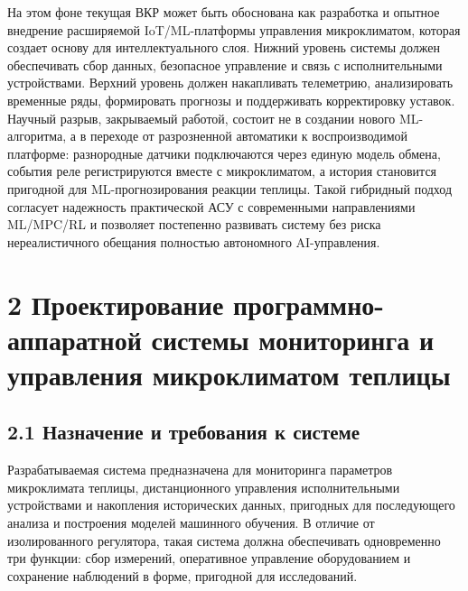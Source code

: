 \documentclass[a4paper,14pt]{extarticle}
\begin{document}
На этом фоне текущая ВКР может быть обоснована как разработка и опытное
внедрение расширяемой IoT/ML-платформы управления микроклиматом, которая
создает основу для интеллектуального слоя. Нижний уровень системы должен
обеспечивать сбор данных, безопасное управление и связь с
исполнительными устройствами. Верхний уровень должен накапливать
телеметрию, анализировать временные ряды, формировать прогнозы и
поддерживать корректировку уставок. Научный разрыв, закрываемый работой,
состоит не в создании нового ML-алгоритма, а в переходе от разрозненной
автоматики к воспроизводимой платформе: разнородные датчики подключаются
через единую модель обмена, события реле регистрируются вместе с
микроклиматом, а история становится пригодной для ML-прогнозирования
реакции теплицы. Такой гибридный подход согласует надежность
практической АСУ с современными направлениями ML/MPC/RL и позволяет
постепенно развивать систему без риска нереалистичного обещания
полностью автономного AI-управления.

\section{2 Проектирование программно-аппаратной системы мониторинга и
управления микроклиматом
теплицы}\label{ux43fux440ux43eux435ux43aux442ux438ux440ux43eux432ux430ux43dux438ux435-ux43fux440ux43eux433ux440ux430ux43cux43cux43dux43e-ux430ux43fux43fux430ux440ux430ux442ux43dux43eux439-ux441ux438ux441ux442ux435ux43cux44b-ux43cux43eux43dux438ux442ux43eux440ux438ux43dux433ux430-ux438-ux443ux43fux440ux430ux432ux43bux435ux43dux438ux44f-ux43cux438ux43aux440ux43eux43aux43bux438ux43cux430ux442ux43eux43c-ux442ux435ux43fux43bux438ux446ux44b}

\subsection{2.1 Назначение и требования к
системе}\label{ux43dux430ux437ux43dux430ux447ux435ux43dux438ux435-ux438-ux442ux440ux435ux431ux43eux432ux430ux43dux438ux44f-ux43a-ux441ux438ux441ux442ux435ux43cux435}

Разрабатываемая система предназначена для мониторинга параметров
микроклимата теплицы, дистанционного управления исполнительными
устройствами и накопления исторических данных, пригодных для
последующего анализа и построения моделей машинного обучения. В отличие
от изолированного регулятора, такая система должна обеспечивать
одновременно три функции: сбор измерений, оперативное управление
оборудованием и сохранение наблюдений в форме, пригодной для
исследований.
\end{document}
